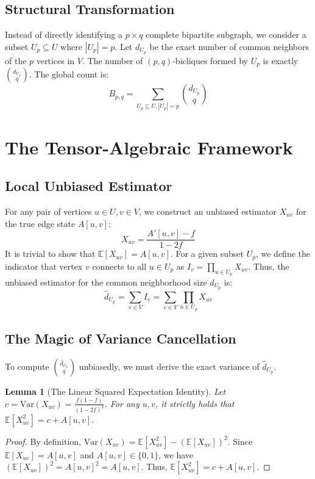 \documentclass[11pt,a4paper]{article}
\newtheorem{lemma}{Lemma}
\begin{document}
\subsection{Structural Transformation}
Instead of directly identifying a $p \times q$ complete bipartite subgraph, we consider a subset $U_p \subseteq U$ where $|U_p| = p$. 
Let $d_{U_p}$ be the exact number of common neighbors of the $p$ vertices in $V$. The number of $(p,q)$-bicliques formed by $U_p$ is exactly $\binom{d_{U_p}}{q}$. The global count is:
\begin{equation}
    B_{p,q} = \sum_{U_p \subseteq U, |U_p|=p} \binom{d_{U_p}}{q}
\end{equation}

\section{The Tensor-Algebraic Framework}
\subsection{Local Unbiased Estimator}
For any pair of vertices $u \in U, v \in V$, we construct an unbiased estimator $X_{uv}$ for the true edge state $A[u,v]$:
\begin{equation}
    X_{uv} = \frac{A'[u,v] - f}{1 - 2f}
\end{equation}
It is trivial to show that $\mathbb{E}[X_{uv}] = A[u,v]$. 
For a given subset $U_p$, we define the indicator that vertex $v$ connects to all $u \in U_p$ as $I_v = \prod_{u \in U_p} X_{uv}$. 
Thus, the unbiased estimator for the common neighborhood size $d_{U_p}$ is:
\begin{equation}
    \hat{d}_{U_p} = \sum_{v \in V} I_v = \sum_{v \in V} \prod_{u \in U_p} X_{uv}
\end{equation}

\subsection{The Magic of Variance Cancellation}
To compute $\binom{\hat{d}_{U_p}}{q}$ unbiasedly, we must derive the exact variance of $\hat{d}_{U_p}$. 

\begin{lemma}[The Linear Squared Expectation Identity]
Let $c = \text{Var}(X_{uv}) = \frac{f(1-f)}{(1-2f)^2}$. For any $u,v$, it strictly holds that $\mathbb{E}[X_{uv}^2] = c + A[u,v]$.
\end{lemma}
\begin{proof}
By definition, $\text{Var}(X_{uv}) = \mathbb{E}[X_{uv}^2] - (\mathbb{E}[X_{uv}])^2$.
Since $\mathbb{E}[X_{uv}] = A[u,v]$ and $A[u,v] \in \{0,1\}$, we have $(\mathbb{E}[X_{uv}])^2 = A[u,v]^2 = A[u,v]$. Thus, $\mathbb{E}[X_{uv}^2] = c + A[u,v]$.
\end{proof}
\end{document}
